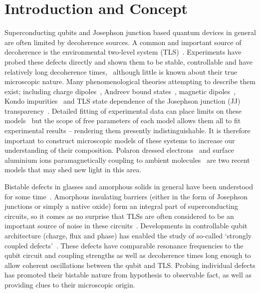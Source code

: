 \section{Introduction and Concept}
Superconducting qubits and Josephson junction based quantum devices in general are often limited by decoherence sources.
A common and important source of decoherence is the environmental two-level system (TLS)~\cite{Dutta1981, Shnirman2005}.
Experiments have probed these defects directly and shown them to be stable, controllable and have relatively long decoherence times,~\cite{Simmonds2004, Neeley2008, Shalibo2010, Lupascu2009, Lisenfeld2010, Gunnarsson2013} although little is known about their true microscopic nature. Many phenomenological theories attempting to describe them exist; including charge dipoles~\cite{Martinis2005}, Andreev bound states~\cite{DeSousa2009}, magnetic dipoles~\cite{Sendelbach2008}, Kondo impurities~\cite{Faoro2007} and TLS state dependence of the Josephson junction (JJ) transparency~\cite{Ku2005}.
Detailed fitting of experimental data can place limits on these models~\cite{Cole2010} but the scope of free parameters of each model allows them all to fit experimental results -- rendering them presently indistinguishable.
It is therefore important to construct microscopic models of these systems to increase our understanding of their composition.
Polaron dressed electrons~\cite{Agarwal2013} and surface aluminium ions paramagnetically coupling to ambient molecules~\cite{Lee2014} are two recent models that may shed new light in this area.

Bistable defects in glasses and amorphous solids in general have been understood for some time~\cite{Anderson1972}.
Amorphous insulating barriers (either in the form of Josephson junctions or simply a native oxide) form an integral part of superconducting circuits, so it comes as no surprise that TLSs are often considered to be an important source of noise in these circuits~\cite{Dutta1981, Shnirman2005, Martinis2005}.
Developments in controllable qubit architecture (charge, flux and phase) has enabled the study of so-called `strongly coupled defects'~\cite{Neeley2008, Lupascu2009, Lisenfeld2010}.
These defects have comparable resonance frequencies to the qubit circuit and coupling strengths as well as decoherence times long enough to allow coherent oscillations between the qubit and TLS.
Probing individual defects has promoted their bistable nature from hypothesis to observable fact, as well as providing clues to their microscopic origin.

